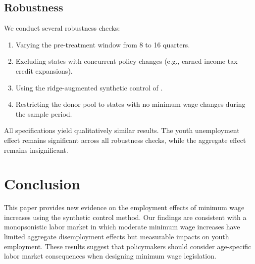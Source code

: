 \documentclass{article}
\begin{document}

\subsection{Robustness}

We conduct several robustness checks:

\begin{enumerate}
  \item Varying the pre-treatment window from 8 to 16 quarters.
  \item Excluding states with concurrent policy changes (e.g., earned income tax credit expansions).
  \item Using the ridge-augmented synthetic control of \citet{ben2021augmented}.
  \item Restricting the donor pool to states with no minimum wage changes during the sample period.
\end{enumerate}

All specifications yield qualitatively similar results. The youth unemployment effect remains significant across all robustness checks, while the aggregate effect remains insignificant.

\section{Conclusion}

This paper provides new evidence on the employment effects of minimum wage increases using the synthetic control method. Our findings are consistent with a monopsonistic labor market in which moderate minimum wage increases have limited aggregate disemployment effects but measurable impacts on youth employment. These results suggest that policymakers should consider age-specific labor market consequences when designing minimum wage legislation.



\end{document}
